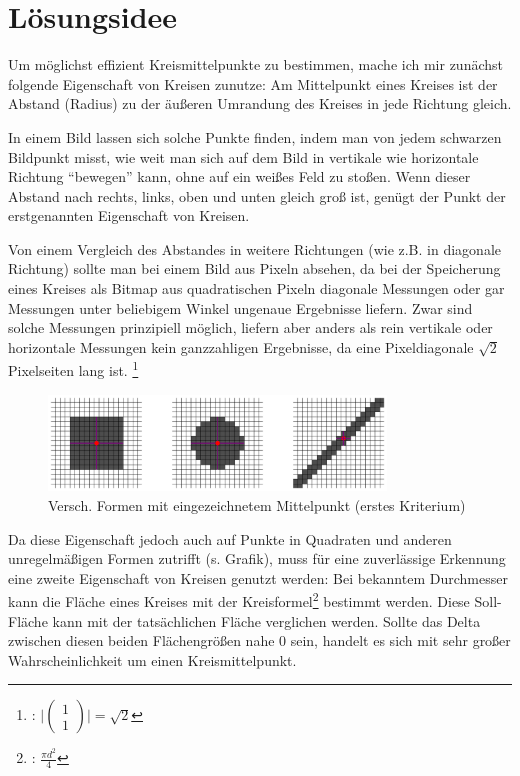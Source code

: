 \section{Lösungsidee}
Um möglichst effizient Kreismittelpunkte zu bestimmen, mache ich mir zunächst folgende Eigenschaft von Kreisen zunutze: Am Mittelpunkt eines Kreises ist der Abstand (Radius) zu der äußeren Umrandung des Kreises in jede Richtung gleich.

In einem Bild lassen sich solche Punkte finden, indem man von jedem schwarzen Bildpunkt misst, wie weit man sich auf dem Bild in vertikale wie horizontale Richtung "`bewegen"' kann, ohne auf ein weißes Feld zu stoßen. Wenn dieser Abstand nach rechts, links, oben und unten gleich groß ist, genügt der Punkt der erstgenannten Eigenschaft von Kreisen. 

Von einem Vergleich des Abstandes in weitere Richtungen (wie z.B. in diagonale Richtung) sollte man bei einem Bild aus Pixeln absehen, da bei der Speicherung eines Kreises als Bitmap aus quadratischen Pixeln diagonale Messungen oder gar Messungen unter beliebigem Winkel ungenaue Ergebnisse liefern. Zwar sind solche Messungen prinzipiell möglich, liefern aber anders als rein vertikale oder horizontale Messungen kein ganzzahligen Ergebnisse, da eine Pixeldiagonale \(\sqrt{2}\) Pixelseiten lang ist.
\footnote{: \( \vert \begin{pmatrix}1\\1\end{pmatrix} \vert = \sqrt{2}\)}

\begin{figure}[!ht]
	\centering	
	\includegraphics[width=0.8\textwidth]{Grafiken/durchmesservergleich}
	\caption{Versch. Formen mit eingezeichnetem Mittelpunkt (erstes Kriterium)}
\end{figure}

Da diese Eigenschaft jedoch auch auf Punkte in Quadraten und anderen unregelmäßigen Formen zutrifft (s. Grafik), muss für eine zuverlässige Erkennung eine zweite Eigenschaft von Kreisen genutzt werden: Bei bekanntem Durchmesser kann die Fläche eines Kreises mit der Kreisformel\footnote{: \(\frac{\pi d^2}{4}\)} bestimmt werden. Diese Soll-Fläche kann mit der tatsächlichen Fläche verglichen werden. Sollte das Delta zwischen diesen beiden Flächengrößen nahe 0 sein, handelt es sich mit sehr großer Wahrscheinlichkeit um einen Kreismittelpunkt.

